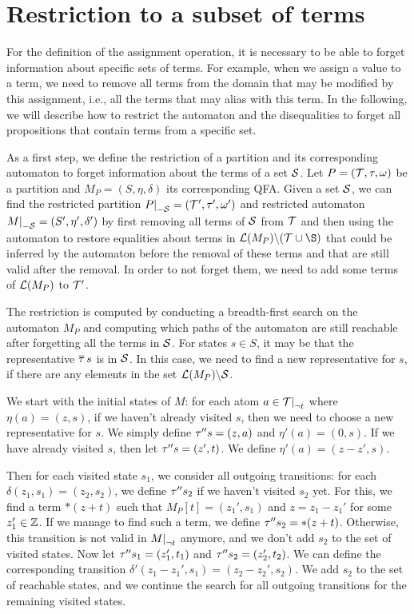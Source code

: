 \section{Restriction to a subset of terms}

For the definition of the assignment operation, it is necessary to be able to forget information about specific sets of terms.
For example, when we assign a value to a term, we need to remove all terms from the domain that may be modified by this assignment, i.e., all the terms that may alias with this term.
In the following, we will describe how to restrict the automaton and the disequalities to forget all propositions that contain terms from a specific set.

As a first step, we define the restriction of a partition and its corresponding automaton to forget information about the terms of a set $\mathcal{S}$.
Let $P = (\mathcal{T}, \tau, \omega)$ be a partition and $M_P = (S, \eta, \delta)$ its corresponding QFA.\@
Given a set $\mathcal{S}$, we can find the restricted partition $\restr{P}{-\Set} = (\T', \tau', \omega')$ and restricted
automaton $\restr{M}{-\Set} = (S', \eta', \delta')$ by first removing all terms of $\mathcal{S}$ from $\mathcal{T}$ and
then using the automaton to restore equalities about terms in $\L(M_P) \backslash (\T \cup \S)$ that could be inferred by
the automaton before the removal of these terms and that are still valid after the removal.
In order to not forget them, we need to add some terms of $\mathcal{L}(M_P)$ to $\mathcal{T}'$.

\begin{example}
\end{example}

The restriction is computed by conducting a breadth-first search on the automaton $M_P$ and computing which paths of the automaton are still reachable after forgetting all the terms in $\mathcal{S}$.
For states $s \in S$, it may be that the representative $\overline{\tau}\,s$ is in $\mathcal{S}$.
In this case, we need to find a new representative for $s$, if there are any elements in
the set $\mathcal{L}(M_P) \backslash \mathcal{S}$.

We start with the initial states of $M$:
for each atom $a \in \restr{\T}{\neg t}$ where $\eta(a) = (z, s)$, if we haven't already visited $s$, then we need to choose a new representative for $s$. We simply define $\tau'' s = (z, a)$ and $\eta'(a) = (0, s)$.
If we have already visited $s$, then let $\tau'' s = (z', t)$. We define $\eta'(a) = (z - z', s)$.

Then for each visited state $s_1$, we consider all outgoing transitions: for each $\delta(z_1, s_1) = (z_2, s_2)$,
we define $\tau'' s_2$ if we haven't visited $s_2$ yet.
For this, we find a term $*(z+t)$ such that $M_P[t] = (z_1', s_1)$ and $z = z_1 - z_1'$ for some $z_1' \in \mathbb{Z}$.
If we manage to find such a term, we define $\tau'' s_2 = *(z+t)$.
Otherwise, this transition is not valid in $\restr{M}{\neg t}$ anymore, and we don't add $s_2$ to the set of visited states.
Now let $\tau'' s_1 = (z_1', t_1)$ and $\tau'' s_2 = (z_2', t_2)$.
We can define the corresponding transition $\delta'(z_1 - z_1', s_1) = (z_2 - z_2', s_2)$.
We add $s_2$ to the set of reachable states, and we continue the search for all outgoing transitions for the remaining visited states.

